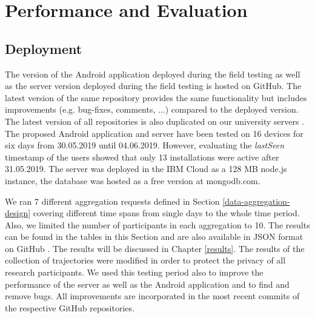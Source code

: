 \chapter{Performance and Evaluation}\label{chapter:performance}
\section{Deployment}\label{deployment}
The version of the Android application deployed during the field testing \parencite{final-version-app} as well as the server version deployed during the field testing \parencite{final-version-server} is hosted on GitHub. The latest version of the same repository provides the same functionality but includes improvements (e.g. bug-fixes, comments, ...) compared to the deployed version. The latest version of all repositories is  also duplicated on our university servers \parencite{lrz}.
The proposed Android application and server have been tested on 16 devices for six days from 30.05.2019 until 04.06.2019. However, evaluating the \textit{lastSeen} timestamp of the users showed that only 13 installations were active after 31.05.2019. The server was deployed in the IBM Cloud as a 128 MB node.js instance, the database was hosted as a free version at mongodb.com.

We ran 7 different aggregation requests defined in Section \ref{data-aggregation-design} covering different time spans from single days to the whole time period. Also, we limited the number of participants in each aggregation to 10. The results can be found in the tables in this Section and are also available in JSON format on GitHub \parencite{github-results}. The results will be discussed in Chapter \ref{results}. The results of the collection of trajectories were modified in order to protect the privacy of all research participants. We used this testing period also to improve the performance of the server as well as the Android application and to find and remove bugs. All improvements are incorporated in the most recent commits of the respective GitHub repositories.

